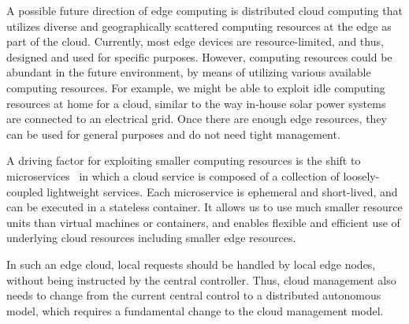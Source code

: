 
A possible future direction of edge computing is distributed cloud
computing that utilizes diverse and geographically scattered computing
resources at the edge as part of the cloud.
Currently, most edge devices are resource-limited, and thus, designed
and used for specific purposes.
However, computing resources could be abundant in the future environment,
by means of utilizing various available computing resources.
For example, we might be able to exploit idle computing resources at
home for a cloud, similar to the way in-house solar power systems are
connected to an electrical grid.
Once there are enough edge resources, they can be used for general
purposes and do not need tight management.

A driving factor for exploiting smaller computing resources
is the shift to microservices~\cite{nadareishvili2016microservice}
in which a cloud service is composed of a collection of loosely-coupled
lightweight services.
Each microservice is ephemeral and short-lived, and can be executed
in a stateless container.
It allows us to use much smaller resource units than virtual machines
or containers, and enables flexible and efficient use of underlying cloud
resources including smaller edge resources.

In such an edge cloud, local requests should be handled by local edge
nodes, without being instructed by the central controller.
Thus, cloud management also needs to change from the current central
control to a distributed autonomous model, which requires a
fundamental change to the cloud management model.


